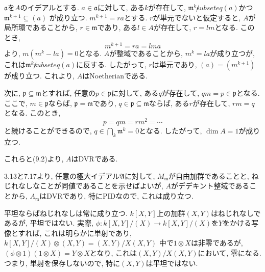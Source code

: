 \documentclass[dvipdfmx]{jsarticle}
\begin{document}
    \begin{problem}
        $\mathfrak{a}$を$A$のイデアルとする.
        $a \in \mathfrak{a}$に対して, ある$k$が存在して, $\mathfrak{m}^k \not subseteq (a)$かつ
        $\mathfrak{m}^{k+1} \subseteq (a)$
        が成り立つ.
        $m^{k+1} = ra$とする.
        $r$が単元でないと仮定すると, $A$が局所環であることから, $r \in \mathfrak{m}$であり,
        ある$l \in A$が存在して, $r = lm$となる.
        このとき,
        \[
            m^{k+1} = ra = lma
        \]
        より, $m(m^k-la) = 0$となる.
        $A$が整域であることから, $m^k = la$が成り立つが, これは$\mathfrak{m}^k \not subseteq (a)$に反する.
        したがって, $r$は単元であり, $(a) = (m^{k+1})$が成り立つ.
        これより, $A$はNoetherianである.

        次に, $\mathfrak{p} \subseteq \mathfrak{m}$とすれば, 任意の$p \in \mathfrak{p}$に対して,
        ある$q$が存在して, $qm = p \in \mathfrak{p}$となる.
        ここで, $m \in \mathfrak{p}$ならば, $\mathfrak{p} = \mathfrak{m}$であり,
        $q \in \mathfrak{p} \subseteq \mathfrak{m}$ならば,
        ある$r$が存在して, $rm = q$となる.
        このとき,
        \[
            p = qm = rm^2 = \cdots
        \]
        と続けることができるので, $q \in \bigcap_{k} \mathfrak{m}^k = 0$となる.
        したがって, $\dim{A} = 1$が成り立つ.

        これらと(9.2)より, $A$はDVRである.
    \end{problem}

    \begin{problem}
        3.13と7.17より, 任意の極大イデアル$\mathfrak{A}$に対して,
        $M_\mathfrak{m}$が自由加群であることと, ねじれなしなことが同値であることを示せばよいが,
        $A$がデデキント整域であることから, $A_\mathfrak{m}$はDVRであり,
        特にPIDなので, これは成り立つ.
    \end{problem}

    \begin{note}
        平坦ならばねじれなしは常に成り立つ.
        $k[X,Y]$上の加群$(X,Y)$はねじれなしであるが, 平坦ではない.
        実際, $\phi: k[X, Y]/(X) \to k[X,Y]/(X)$を$Y$をかける写像とすれば,
        これは明らかに単射であり,
        $k[X,Y]/(X) \otimes (X,Y) = (X,Y)/X(X,Y)$
        中で$1 \otimes X$は非零であるが,
        $(\phi \otimes 1)(1\otimes X) = Y\otimes X$となり, これは$(X,Y)/X(X,Y)$において, 零になる.
        つまり, 単射を保存しないので, 特に$(X,Y)$は平坦ではない.
    \end{note}
\end{document}
